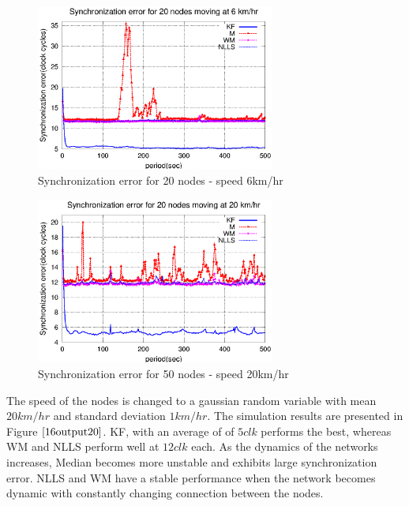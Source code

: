 \documentclass[a4paper,10pt]{report}
\begin{document}
\paragraph*{}
\begin{figure}
\centering
\includegraphics[width=0.7\textwidth]{16output-s6}
\caption{Synchronization error for 20 nodes - speed 6km/hr} \label{16output6}
\end{figure}
\begin{figure}
\centering
\includegraphics[width=0.7\textwidth]{16output-s20}
\caption{Synchronization error for 50 nodes - speed 20km/hr}
\label{16output20}
\end{figure}
The speed of the nodes is changed to a gaussian random variable with mean $20km/hr$ and standard deviation $1km/hr$. The simulation results are presented in Figure $\ref{16output20}$. KF, with an average of of $5 clk$ performs the best, whereas WM and NLLS perform well at $12 clk$ each. As the dynamics of the networks increases, Median becomes more unstable and exhibits large synchronization error. NLLS and WM have a stable performance when the network becomes dynamic with constantly changing connection between the nodes.
\end{document}
